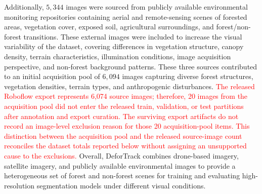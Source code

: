 \documentclass[journal,article,submit,pdftex,moreauthors]{Definitions/mdpi}
\begin{document}
Additionally, $5,344$ images were sourced from publicly available environmental monitoring repositories containing aerial and remote-sensing scenes of forested areas, vegetation cover, exposed soil, agricultural surroundings, and forest/non-forest transitions. These external images were included to increase the visual variability of the dataset, covering differences in vegetation structure, canopy density, terrain characteristics, illumination conditions, image acquisition perspective, and non-forest background patterns. These three sources contributed to an initial acquisition pool of $6,094$ images capturing diverse forest structures, vegetation densities, terrain types, and anthropogenic disturbances. \textcolor{red}{The released Roboflow export represents 6,074 source images; therefore, 20 images from the acquisition pool did not enter the released train, validation, or test partitions after annotation and export curation. The surviving export artifacts do not record an image-level exclusion reason for those 20 acquisition-pool items. This distinction between the acquisition pool and the released source-image count reconciles the dataset totals reported below without assigning an unsupported cause to the exclusions.} Overall, DeforTrack combines drone-based imagery, satellite imagery, and publicly available environmental images to provide a heterogeneous set of forest and non-forest scenes for training and evaluating high-resolution segmentation models under different visual conditions.

\begin{table}[t]
\centering
\caption{Inter-annotator agreement on the validation subset ($n=248$ images).}
\label{tab:interannotator}
\end{table}
\end{document}
